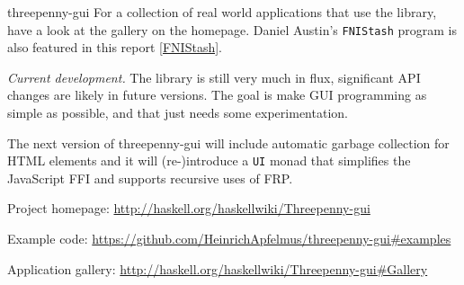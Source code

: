\begin{hcarentry}[new]{threepenny-gui}
For a collection of real world applications that use the library, have a look at the gallery on the homepage. Daniel Austin's \verb`FNIStash` program is also featured in this report \cref{FNIStash}.

\emph{Current development.}
The library is still very much in flux, significant API changes are likely in future versions. The goal is make GUI programming as simple as possible, and that just needs some experimentation.

The next version of threepenny-gui will include automatic garbage collection for HTML elements and it will (re-)introduce a \verb`UI` monad that simplifies the JavaScript FFI and supports recursive uses of FRP.

\FurtherReading
\begin{compactitem}
\item Project homepage: \url{http://haskell.org/haskellwiki/Threepenny-gui}
\item Example code: \url{https://github.com/HeinrichApfelmus/threepenny-gui#examples}
\item Application gallery: \url{http://haskell.org/haskellwiki/Threepenny-gui#Gallery}
\end{compactitem}
\end{hcarentry}
